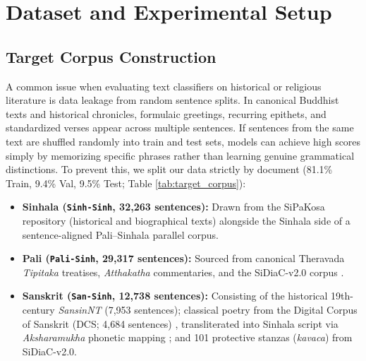 \documentclass[11pt]{article}
\begin{document}
\section{Dataset and Experimental Setup}
\label{sec:dataset}

\subsection{Target Corpus Construction}
A common issue when evaluating text classifiers on historical or religious literature is data leakage from random sentence splits. In canonical Buddhist texts and historical chronicles, formulaic greetings, recurring epithets, and standardized verses appear across multiple sentences. If sentences from the same text are shuffled randomly into train and test sets, models can achieve high scores simply by memorizing specific phrases rather than learning genuine grammatical distinctions. To prevent this, we split our data strictly by document (81.1\% Train, 9.4\% Val, 9.5\% Test; Table \ref{tab:target_corpus}):
\begin{itemize}
    \item \textbf{Sinhala (\texttt{Sinh-Sinh}, 32,263 sentences):} Drawn from the SiPaKosa repository (historical and biographical texts) alongside the Sinhala side of a sentence-aligned Pali--Sinhala parallel corpus.
    \item \textbf{Pali (\texttt{Pali-Sinh}, 29,317 sentences):} Sourced from canonical Theravada \textit{Tipitaka} treatises, \textit{Atthakatha} commentaries, and the SiDiaC-v2.0 corpus \cite{jayatilleke-de-silva-2025-sidiac}.
    \item \textbf{Sanskrit (\texttt{San-Sinh}, 12,738 sentences):} Consisting of the historical 19th-century \textit{SansinNT} (7,953 sentences); classical poetry from the Digital Corpus of Sanskrit (DCS; 4,684 sentences) \cite{hellwig2010dcs}, transliterated into Sinhala script via \textit{Aksharamukha} phonetic mapping \cite{rajan2023aksharamukha}; and 101 protective stanzas (\textit{kavaca}) from SiDiaC-v2.0.
\end{itemize}

\begin{table}[t]
\centering
\small
\setlength{\tabcolsep}{3.5pt}
\caption{Target corpus statistics ($N=74,318$). Partitioned with document-level grouping to prevent data leakage.}
\label{tab:target_corpus}
\end{table}
\end{document}
